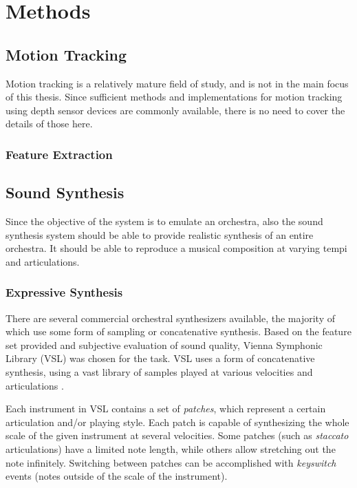 \chapter{Methods}
\label{chapter:methods}


\section{Motion Tracking}

Motion tracking is a relatively mature field of study,
and is not in the main focus of this thesis.
Since sufficient methods and implementations for
motion tracking using depth sensor devices
are commonly available,
there is no need to cover the details of those here.


\subsection{Feature Extraction}

\section{Sound Synthesis}

Since the objective of the system is to emulate an orchestra,
also the sound synthesis system should be able to
provide realistic synthesis of an entire orchestra.
It should be able to reproduce a musical composition
at varying tempi and articulations.

\subsection{Expressive Synthesis}
\label{subsec:expressive_synth}

There are several commercial orchestral synthesizers available,
the majority of which use some form of sampling or concatenative synthesis.
Based on the feature set provided and
subjective evaluation of sound quality,
Vienna Symphonic Library (VSL) \cite{vsl} was chosen for the task.
VSL uses a form of concatenative synthesis,
using a vast library of samples played at
various velocities and articulations \cite{schwartz2006}.

Each instrument in VSL contains a set of \textit{patches},
which represent a certain articulation and/or playing style.
Each patch is capable of synthesizing
the whole scale of the given instrument at several velocities.
Some patches (such as \textit{staccato} articulations)
have a limited note length,
while others allow stretching out the note infinitely.
Switching between patches can be accomplished with \textit{keyswitch} events
(notes outside of the scale of the instrument).

